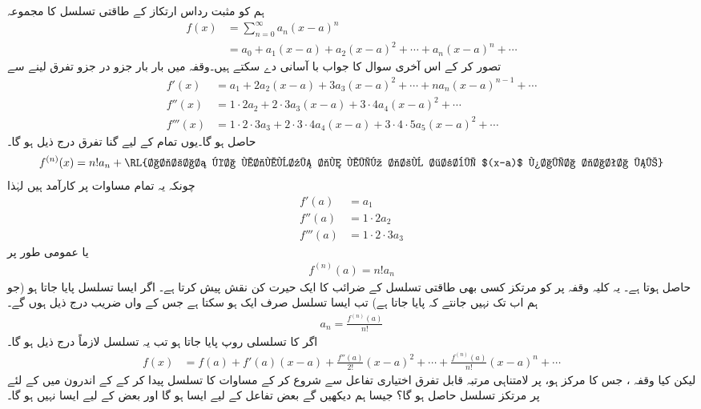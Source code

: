 ہم   کو مثبت رداس ارتکاز کے طاقتی تسلسل کا مجموعہ 
\begin{align*}
f(x)&=\sum_{n=0}^{\infty}a_n(x-a)^n\\
&=a_0+a_1(x-a)+a_2(x-a)^2+\cdots+a_n(x-a)^n+\cdots
\end{align*}
تصور کر کے اس آخری سوال کا جواب با آسانی دے سکتے ہیں۔وقفہ  میں  بار بار جزو در جزو تفرق لینے سے 
\begin{align*}
f'(x)&=a_1+2a_2(x-a)+3a_3(x-a)^2+\cdots+na_n(x-a)^{n-1}+\cdots\\
f''(x)&=1\cdot 2a_2+2\cdot 3a_3(x-a)+3\cdot 4a_4(x-a)^2+\cdots\\
f'''(x)&=1\cdot2\cdot3a_3+2\cdot3\cdot4a_4(x-a)+3\cdot4\cdot5a_5(x-a)^2+\cdots
\end{align*}
حاصل ہو گا۔یوں تمام  کے لیے  گنا تفرق درج ذیل ہو گا۔
\begin{align*}
f^{(n)}(x)=n!a_n+\text{\RL{اجزاء کا مجموعہ جن میں جزو ضربی $(x-a)$ پایا جاتا ہے}}
\end{align*}
چونکہ یہ تمام مساوات  پر کارآمد ہیں لہٰذا 
\begin{align*}
f'(a)&=a_1\\
f''(a)&=1\cdot 2 a_2\\
f'''(a)&=1\cdot 2\cdot 3a_3
\end{align*}
یا عمومی طور پر
\begin{align*}
f^{(n)}(a)=n!a_n
\end{align*}
حاصل ہوتا ہے۔ یہ کلیہ وقفہ  پر  کو مرتکز کسی بھی طاقتی تسلسل  کے ضرائب کا ایک حیرت کن نقش پیش کرتا ہے۔ اگر ایسا تسلسل پایا جاتا ہو (جو ہم اب تک نہیں جانتے کہ پایا جاتا ہے) تب ایسا تسلسل صرف ایک ہو سکتا ہے جس کے    واں ضریب  درج ذیل ہوں گے۔
\begin{align*}
a_n=\frac{f^{(n)}(a)}{n!}
\end{align*}
اگر  کا تسلسلی روپ پایا جاتا ہو تب یہ تسلسل لازماً درج ذیل ہو گا۔
\begin{align}\label{مساوات_تسلسل_عمومی_تسلسل}
f(x)&=f(a)+f'(a)(x-a)+\frac{f''(a)}{2!}(x-a)^2+\cdots+\frac{f^{(n)}(a)}{n!}(x-a)^n+\cdots
\end{align}
لیکن کیا وقفہ ، جس کا مرکز  ہو، پر  لامتناہی  مرتبہ  قابل تفرق اختیاری تفاعل  سے شروع کر کے مساوات  کا تسلسل پیدا کر کے  کے اندرون میں      کے لئے پر مرتکز تسلسل حاصل ہو گا؟ جیسا ہم دیکھیں گے  بعض تفاعل کے لیے ایسا ہو گا اور بعض کے لیے ایسا نہیں ہو گا۔

